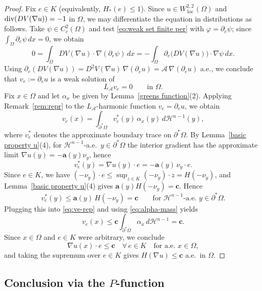 \documentclass[reqno,11pt]{amsart}
\def\loc{{\mathop\mathrm{\,loc\,}}}
\numberwithin{equation}{section}
\theoremstyle{remark}
\begin{document}
\begin{proof}
Fix $e\in K$ (equivalently, $H_*(e)\le 1$). Since $u\in W^{2,2}_{\loc}(\Omega)$ and
${\rm div}(DV(\nabla u))=-1$ in $\Omega$, we may differentiate the equation in distributions as follows.
Take $\psi\in C_c^2(\Omega)$ and test \eqref{eq:weak set finite per} with $\varphi=\partial_e\psi$; since
$\int_\Omega \partial_e\psi\,dx=0$, we obtain
\[
0=\int_\Omega DV(\nabla u)\cdot \nabla(\partial_e\psi)\,dx
= -\int_\Omega \partial_e\!\bigl(DV(\nabla u)\bigr)\cdot \nabla\psi\,dx.
\]
Using $\partial_e(DV(\nabla u))=D^2V(\nabla u)\,\nabla(\partial_e u)=\mathcal A\,\nabla(\partial_e u)$ a.e., we conclude that
$v_e:=\partial_e u$ is a weak solution of
\[
L_{\mathcal A} v_e = 0\qquad \text{in }\Omega.
\]
Fix $x\in\Omega$ and let $\alpha_x$ be given by Lemma~\ref{greens function}(2).
Applying Remark~\ref{rem:repr} to the $L_{\mathcal A}$-harmonic function $v_e=\partial_e u$, we obtain
\begin{equation}\label{eq:ve-rep}
v_e(x)=\int_{\partial^*\Omega} v_e^*(y)\,\alpha_x(y)\,d\mathscr H^{n-1}(y),
\end{equation}
where $v_e^*$ denotes the approximate boundary trace on $\partial^*\Omega$.
By Lemma~\ref{basic property u}(4), for $\mathscr H^{n-1}$-a.e.\ $y\in\partial^*\Omega$ the interior gradient has the approximate
limit $\nabla u(y)=-\mathbf a(y)\nu_y$, hence
\[
v_e^*(y)=\nabla u(y)\cdot e=-\mathbf a(y)\,\nu_y\cdot e.
\]
Since $e\in K$, we have $(-\nu_y)\cdot e\le \sup_{z\in K}(-\nu_y)\cdot z = H(-\nu_y)$, and Lemma~\ref{basic property u}(4) gives
$\mathbf a(y)H(-\nu_y)=\mathbf c$. Hence
\[
v_e^*(y)\le \mathbf a(y)\,H(-\nu_y)=\mathbf c\qquad\text{for $\mathscr H^{n-1}$-a.e.\ }y\in\partial^*\Omega.
\]
Plugging this into \eqref{eq:ve-rep} and using \eqref{eq:alpha-mass} yields
\[
v_e(x)\le \mathbf c\int_{\partial^*\Omega}\alpha_x\,d\mathscr H^{n-1}=\mathbf c.
\]
Since $x\in\Omega$ and $e\in K$ were arbitrary, we conclude
\[
{\nabla u(x)\cdot e\le \mathbf c\quad \forall\,e\in K\quad\text{for a.e. }x\in\Omega,}
\]
and taking the supremum over $e\in K$ gives {$H(\nabla u)\le \mathbf c$ a.e.\ in $\Omega$}.
\end{proof}

\subsection{Conclusion via the $P$-function}
\end{document}
